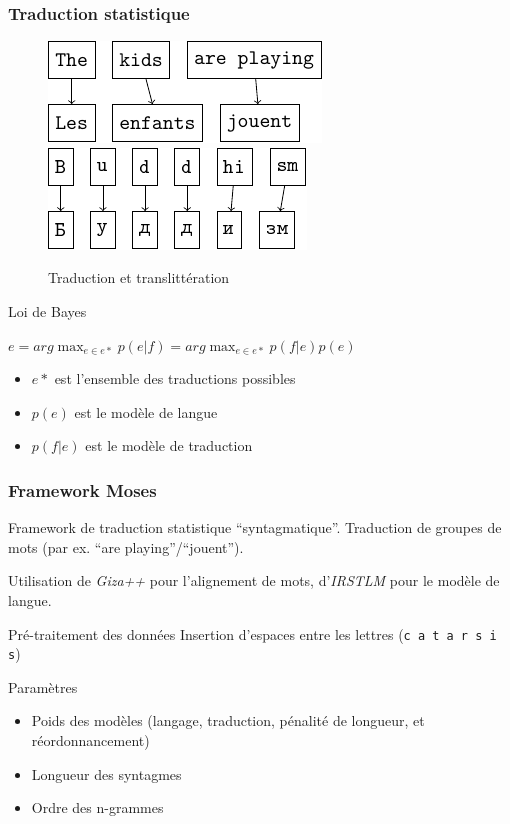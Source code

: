 \documentclass{beamer}
\begin{document}
\begin{frame}
    \frametitle{Traduction statistique}
    \begin{figure}[H]
        \label{translation_alignment}
        \caption{Traduction et translittération}
        \centering
        \vspace{0.3cm}
        \includegraphics{word_alignment.pdf}
        \hspace{0.5cm}
        \includegraphics{letter_alignment.pdf}
    \end{figure}
    \begin{block}{Loi de Bayes}
    \begin{center}
    $\displaystyle e = arg \max_{e \in e*} p(e|f) = arg \max_{e \in e*} p(f|e)p(e)$

    \begin{itemize}
        \item $e*$ est l'ensemble des traductions possibles
        \item $p(e)$ est le modèle de langue
        \item $p(f|e)$ est le modèle de traduction
    \end{itemize}
    \end{center}
    \end{block}
\end{frame}
\begin{frame}[fragile]
    \frametitle{Framework Moses}
    Framework de traduction statistique ``syntagmatique''. Traduction de groupes de mots (par ex. ``are playing''/``jouent'').

    Utilisation de \emph{Giza++} pour l'alignement de mots, d'\emph{IRSTLM} pour le modèle de langue.

    \begin{block}{Pré-traitement des données}
        Insertion d'espaces entre les lettres (\verb|c a t a r s i s|)
    \end{block}
    \begin{block}{Paramètres}
        \begin{itemize}
            \item Poids des modèles (langage, traduction, pénalité de longueur, et réordonnancement)
            \item Longueur des syntagmes
            \item Ordre des n-grammes
        \end{itemize}
    \end{block}

\end{frame}
\end{document}
